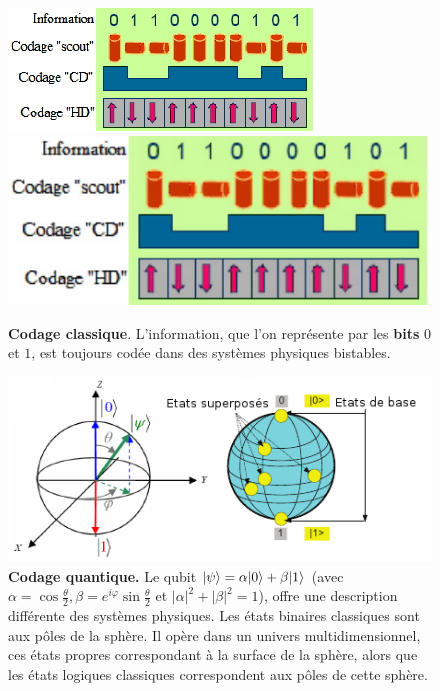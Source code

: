 \begin{figure}[ptbh]
\centering
\ifcase\msipdfoutput
  \includegraphics[scale=1]{graphics/CodageClas.jpg}
\else
  \includegraphics[scale=1]{graphics/CodageClas.pdf}
\fi
\caption{\textbf{Codage classique}. L'information, que l'on représente par les
\textbf{bits} $0$ et $1$, est toujours codée dans des systèmes physiques
bistables.}
\label{fig:CodageClas}%
\end{figure}

\begin{figure}[ptbh]
\centering
  \includegraphics[scale=1]{graphics/SphereBloch.png}%
\caption{\textbf{Codage quantique.} Le qubit $\vert\psi\rangle =\alpha\vert0\rangle
+\beta\vert1\rangle$ (avec $\alpha=\cos\frac{\theta}{2},
\beta=e^{i\varphi}\sin\frac{\theta}{2}$ et $|\alpha|^{2}+|\beta|^{2}=1$), offre
une description différente des systèmes physiques. Les états binaires classiques
sont aux pôles de la sphère. Il opère dans un univers multidimensionnel, ces
états propres correspondant à la surface de la sphère, alors que les états
logiques classiques correspondent aux pôles de cette sphère.}
\label{fig:SphereBloch}
\end{figure}

